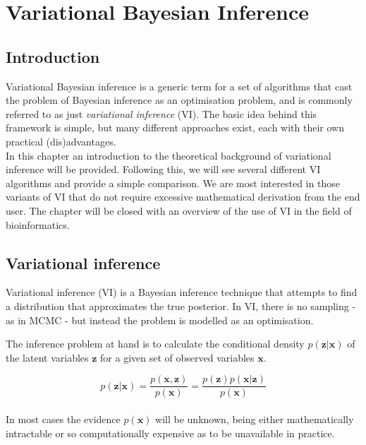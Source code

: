 \chapter{Variational Bayesian Inference} \label{sec:vi}

\section{Introduction}

Variational Bayesian inference is a generic term for a set of algorithms that cast the problem of Bayesian inference as an optimisation problem, and is commonly referred to as just \textit{variational inference} (VI). The basic idea behind this framework is simple, but many different approaches exist, each with their own practical (dis)advantages.
\\
In this chapter an introduction to the theoretical background of variational inference will be provided. Following this, we will see several different VI algorithms and provide a simple comparison. We are most interested in those variants of VI that do not require excessive mathematical derivation from the end user. The chapter will be closed with an overview of the use of VI in the field of bioinformatics.

\section{Variational inference \parencite{vi-review, vi}}

\par Variational inference (VI) is a Bayesian inference technique that attempts to find a distribution that approximates the true posterior. In VI, there is no sampling - as in MCMC - but instead the problem is modelled as an optimisation.
\medskip
\par The inference problem at hand is to calculate the conditional density $p(\bm{{z}}|\bm{x})$ of the latent variables $\bm{z}$ for a given set of observed variables $\bm{x}$.
    
    \begin{equation}
        p(\bm{z} | \bm{x}) = \frac{p(\bm{x}, \bm{z})}{p(\bm{x})} = \frac{p(\bm{z})p(\bm{x}|\bm{z})}{p(\bm{x})}
    \end{equation}
\\
In most cases the evidence $p(\bm{x})$ will be unknown, being either mathematically intractable or so computationally expensive as to be unavailable in practice.


